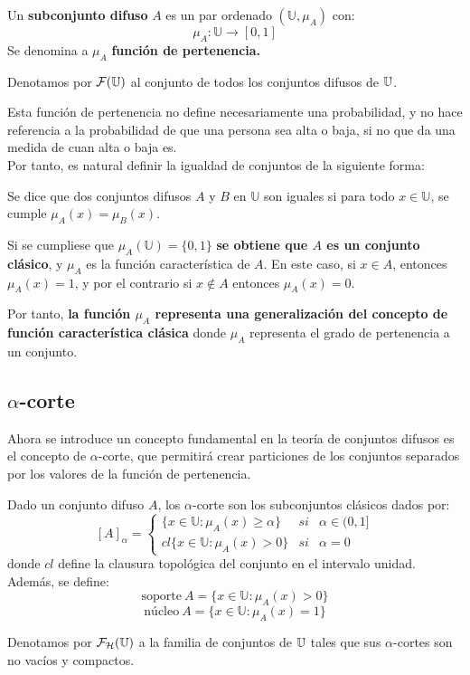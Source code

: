 \begin{definicion}
  \label{def:subconjunto_difuso}
  
  Un \textbf{subconjunto difuso} $A$ es un par ordenado $(\mathbb{U}, \mu_A)$ con:
  \[
  \mu_A : \mathbb{U} \longrightarrow [0,1]
  \]
  Se denomina a $\mu_A$ \textbf{función de pertenencia.}
\end{definicion}
Denotamos por $\mathcal{F}(\mathbb U)$ al conjunto de todos los conjuntos difusos de $\mathbb U$.

Esta función de pertenencia no define necesariamente una probabilidad, y no hace referencia a la probabilidad de que una persona sea alta o baja, si no que da una medida de cuan alta o baja es.\\ 

Por tanto, es natural definir la igualdad de conjuntos de la siguiente forma:

\begin{definicion}
  \label{def:igualdad}
  Se dice que dos conjuntos difusos $A$ y $B$ en $\mathbb{U}$ son iguales si para todo $x \in \mathbb{U}$, se cumple $\mu_A(x) = \mu_B(x)$.
\end{definicion}

Si se cumpliese que $\mu_A(\mathbb{U})=\{0, 1\}$ \textbf{se obtiene que $A$ es un conjunto clásico}, y $\mu_A$ es la función característica de $A$. En este caso, si $x \in A$, entonces $\mu_A(x)=1$, y por el contrario si $x \notin A$ entonces $\mu_A(x)=0$.

Por tanto, \textbf{la función $\mu_A$ representa una generalización del concepto de función característica clásica} donde $\mu_A$ representa el grado de pertenencia a un conjunto.

\subsection{$\alpha$-corte}
Ahora se introduce un concepto fundamental en la teoría de conjuntos difusos es el concepto de $\alpha$-corte, que permitirá crear particiones de los conjuntos separados por los valores de la función de pertenencia.
\begin{definicion}
  \label{def:alpha_corte}
  Dado un conjunto difuso $A$, los $\alpha$-corte son los subconjuntos clásicos dados por:
  \[
    [A]_\alpha = \left\{
    \begin{array}{ccc}
      \{x \in \mathbb{U} : \mu_A(x) \geq \alpha \} & si & \alpha \in (0, 1] \\
      cl\{x \in \mathbb{U} : \mu_A(x) > 0\} & si & \alpha=0
    \end{array}
    \right.
    \]
    donde $cl$ define la clausura topológica del conjunto en el intervalo unidad. Además, se define:
    \[
    \text{soporte} ~ A = \{x \in \mathbb{U} : \mu_A(x) > 0 \}
    \]
    \[
    \text{núcleo} ~ A = \{x \in \mathbb{U} : \mu_A(x) = 1 \}
    \]
\end{definicion}
Denotamos por $\mathcal{F}_\mathcal{H}(\mathbb U)$ a la familia de conjuntos de $\mathbb U$ tales que sus $\alpha$-cortes son no vacíos y compactos.

